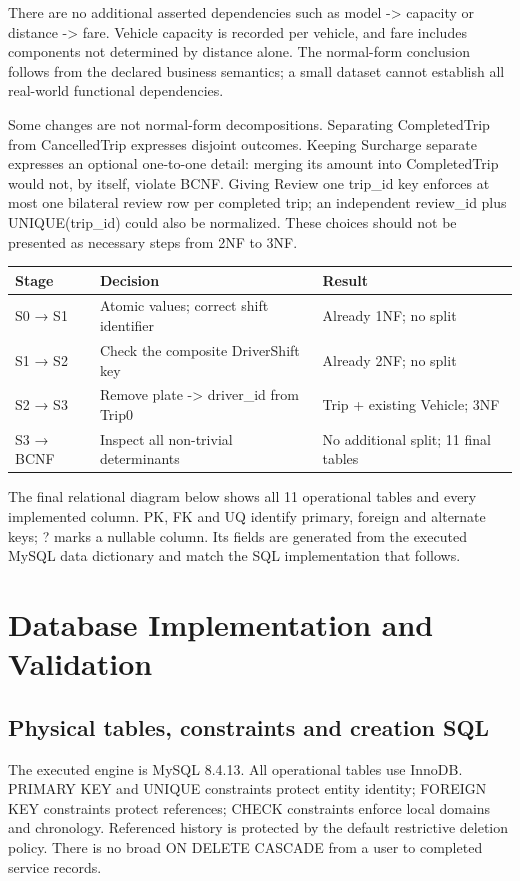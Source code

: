 \documentclass[11pt,a4paper]{article}
\begin{document}
There are no additional asserted dependencies such as model -> capacity or distance -> fare. Vehicle capacity is recorded per vehicle, and fare includes components not determined by distance alone. The normal-form conclusion follows from the declared business semantics; a small dataset cannot establish all real-world functional dependencies.

Some changes are not normal-form decompositions. Separating CompletedTrip from CancelledTrip expresses disjoint outcomes. Keeping Surcharge separate expresses an optional one-to-one detail: merging its amount into CompletedTrip would not, by itself, violate BCNF. Giving Review one trip\_\allowbreak{}id key enforces at most one bilateral review row per completed trip; an independent review\_\allowbreak{}id plus UNIQUE(trip\_\allowbreak{}id) could also be normalized. These choices should not be presented as necessary steps from 2NF to 3NF.

\par\begingroup\small\noindent
\begin{tabularx}{\linewidth}{p{2.5cm}p{6.2cm}X}
\toprule
Stage & Decision & Result\\\midrule
S0 → S1 & Atomic values; correct shift identifier & Already 1NF; no split\\
S1 → S2 & Check the composite DriverShift key & Already 2NF; no split\\
S2 → S3 & Remove plate -> driver\_\allowbreak{}id from Trip0 & Trip + existing Vehicle; 3NF\\
S3 → BCNF & Inspect all non-trivial determinants & No additional split; 11 final tables\\
\bottomrule
\end{tabularx}
\par\endgroup
The final relational diagram below shows all 11 operational tables and every implemented column. PK, FK and UQ identify primary, foreign and alternate keys; ? marks a nullable column. Its fields are generated from the executed MySQL data dictionary and match the SQL implementation that follows.

\clearpage

\endgroup
\clearpage
\section{Database Implementation and Validation}
\subsection{Physical tables, constraints and creation SQL}
The executed engine is MySQL 8.4.13. All operational tables use InnoDB. PRIMARY KEY and UNIQUE constraints protect entity identity; FOREIGN KEY constraints protect references; CHECK constraints enforce local domains and chronology. Referenced history is protected by the default restrictive deletion policy. There is no broad ON DELETE CASCADE from a user to completed service records.
\end{document}
